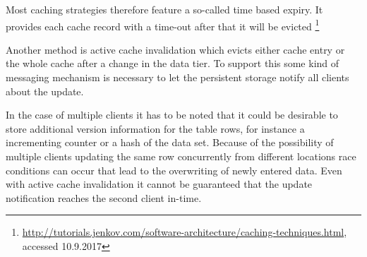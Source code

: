 Most caching strategies therefore feature a so-called time based expiry. It provides each cache record with a time-out after that it will be evicted \footnote{\href{http://tutorials.jenkov.com/software-architecture/caching-techniques.html}{http://tutorials.jenkov.com/software-architecture/caching-techniques.html}, accessed 10.9.2017}

Another method is active cache invalidation which evicts either cache entry or the whole cache after a change in the data tier. To support this some kind of messaging mechanism is necessary to let the persistent storage notify all clients about the update. 

In the case of multiple clients it has to be noted that it could be desirable to store additional version information for the table rows, for instance a incrementing counter or a hash of the data set. Because of the possibility of multiple clients updating the same row concurrently from different locations race conditions can occur that lead to the overwriting of newly entered data. Even with active cache invalidation it cannot be guaranteed that the update notification reaches the second client in-time. 